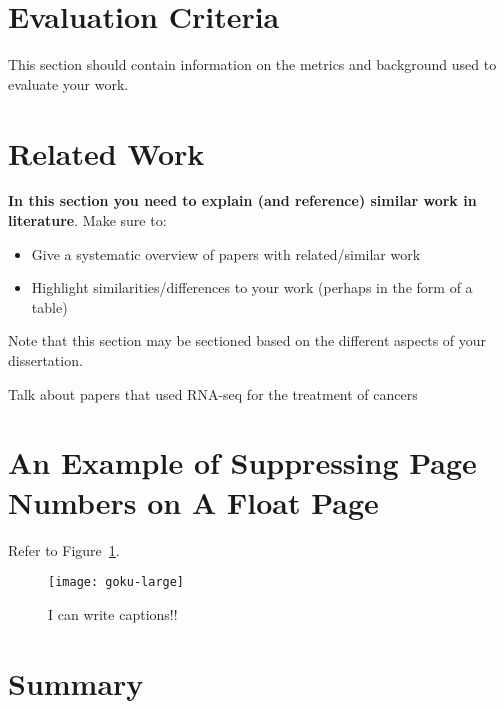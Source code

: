 \section{Evaluation Criteria}
This section should contain information on the metrics and background used to evaluate your work.

\section{Related Work}
\textbf{In this section you need to explain (and reference) similar work in literature}.  Make sure to:

\begin{itemize}
 \item Give a systematic overview of papers with related/similar work
 \item Highlight similarities/differences to your work (perhaps in the form of a table)
\end{itemize}

Note that this section may be sectioned based on the different aspects of your dissertation.

Talk about papers that used RNA-seq for the treatment of cancers


\section{An Example of Suppressing Page Numbers on A Float Page}

Refer to Figure~\ref{fig:largegoku}.

\begin{figure}[!ht]
	\centering
	\texttt{[image: goku-large]}
	\caption[Short Random Caption]{I can write captions!!}        
	\label{fig:largegoku}
\end{figure}

\section{Summary}
